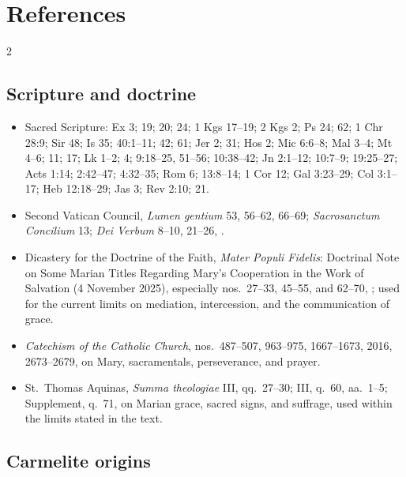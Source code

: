 \clearpage
\section{References}

\begin{multicols}{2}
\footnotesize
\RaggedRight

\subsection{Scripture and doctrine}

\begin{itemize}
\item Sacred Scripture: Ex 3; 19; 20; 24; 1 Kgs 17--19; 2 Kgs 2; Ps 24; 62; 1 Chr 28:9; Sir 48; Is 35; 40:1--11; 42; 61; Jer 2; 31; Hos 2; Mic 6:6--8; Mal 3--4; Mt 4--6; 11; 17; Lk 1--2; 4; 9:18--25, 51--56; 10:38--42; Jn 2:1--12; 10:7--9; 19:25--27; Acts 1:14; 2:42--47; 4:32--35; Rom 6; 13:8--14; 1 Cor 12; Gal 3:23--29; Col 3:1--17; Heb 12:18--29; Jas 3; Rev 2:10; 21.
\item Second Vatican Council, \textit{Lumen gentium} 53, 56--62, 66--69; \textit{Sacrosanctum Concilium} 13; \textit{Dei Verbum} 8--10, 21--26, .
\item Dicastery for the Doctrine of the Faith, \textit{Mater Populi Fidelis}: Doctrinal Note on Some Marian Titles Regarding Mary's Cooperation in the Work of Salvation (4 November 2025), especially nos.~27--33, 45--55, and 62--70, ; used for the current limits on mediation, intercession, and the communication of grace.
\item \textit{Catechism of the Catholic Church}, nos.~487--507, 963--975, 1667--1673, 2016, 2673--2679, on Mary, sacramentals, perseverance, and prayer.
\item St.~Thomas Aquinas, \textit{Summa theologiae} III, qq.~27--30; III, q.~60, aa.~1--5; Supplement, q.~71, on Marian grace, sacred signs, and suffrage, used within the limits stated in the text.
\end{itemize}

\subsection{Carmelite origins}


\end{multicols}
